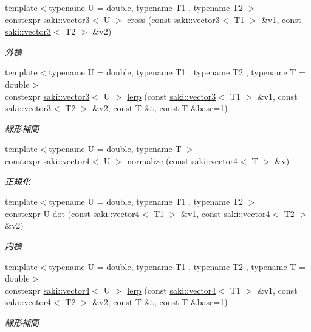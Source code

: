 \begin{DoxyCompactItemize}
{\footnotesize template$<$typename U  = double, typename T1 , typename T2 $>$ }\\constexpr \mbox{\hyperlink{classsaki_1_1vector3}{saki\+::vector3}}$<$ U $>$ \mbox{\hyperlink{namespacesaki_a980242869d69e47ff8b10335e86ccf6f}{cross}} (const \mbox{\hyperlink{classsaki_1_1vector3}{saki\+::vector3}}$<$ T1 $>$ \&v1, const \mbox{\hyperlink{classsaki_1_1vector3}{saki\+::vector3}}$<$ T2 $>$ \&v2)
\begin{DoxyCompactList}\small\item\em 外積 \end{DoxyCompactList}\item 
{\footnotesize template$<$typename U  = double, typename T1 , typename T2 , typename T  = double$>$ }\\constexpr \mbox{\hyperlink{classsaki_1_1vector3}{saki\+::vector3}}$<$ U $>$ \mbox{\hyperlink{namespacesaki_a1dc5233651ca71b38ed5a53ef304e480}{lerp}} (const \mbox{\hyperlink{classsaki_1_1vector3}{saki\+::vector3}}$<$ T1 $>$ \&v1, const \mbox{\hyperlink{classsaki_1_1vector3}{saki\+::vector3}}$<$ T2 $>$ \&v2, const T \&t, const T \&base=1)
\begin{DoxyCompactList}\small\item\em 線形補間 \end{DoxyCompactList}\item 
{\footnotesize template$<$typename U  = double, typename T $>$ }\\constexpr \mbox{\hyperlink{classsaki_1_1vector4}{saki\+::vector4}}$<$ U $>$ \mbox{\hyperlink{namespacesaki_afcef74d7e32ef8cf446d075beeed4b41}{normalize}} (const \mbox{\hyperlink{classsaki_1_1vector4}{saki\+::vector4}}$<$ T $>$ \&v)
\begin{DoxyCompactList}\small\item\em 正規化 \end{DoxyCompactList}\item 
{\footnotesize template$<$typename U  = double, typename T1 , typename T2 $>$ }\\constexpr U \mbox{\hyperlink{namespacesaki_a990ff61a01d4cf819df3fe2774842acf}{dot}} (const \mbox{\hyperlink{classsaki_1_1vector4}{saki\+::vector4}}$<$ T1 $>$ \&v1, const \mbox{\hyperlink{classsaki_1_1vector4}{saki\+::vector4}}$<$ T2 $>$ \&v2)
\begin{DoxyCompactList}\small\item\em 内積 \end{DoxyCompactList}\item 
{\footnotesize template$<$typename U  = double, typename T1 , typename T2 , typename T  = double$>$ }\\constexpr \mbox{\hyperlink{classsaki_1_1vector4}{saki\+::vector4}}$<$ U $>$ \mbox{\hyperlink{namespacesaki_acc3cd6d8e07cbfcd2691c4d9ffe25416}{lerp}} (const \mbox{\hyperlink{classsaki_1_1vector4}{saki\+::vector4}}$<$ T1 $>$ \&v1, const \mbox{\hyperlink{classsaki_1_1vector4}{saki\+::vector4}}$<$ T2 $>$ \&v2, const T \&t, const T \&base=1)
\begin{DoxyCompactList}\small\item\em 線形補間 \end{DoxyCompactList}\end{DoxyCompactItemize}


